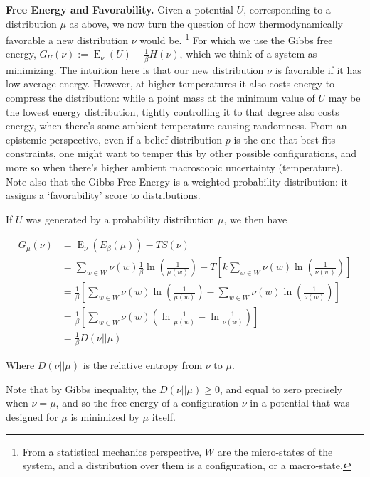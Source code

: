 \documentclass{article}
\theoremstyle{plain}
\theoremstyle{definition}
\theoremstyle{remark}
\DeclareMathOperator{\E}{\mathrm{E}} %
\numberwithin{equation}{section}
\begin{document}
	\textbf{Free Energy and Favorability.} Given a potential $U$, corresponding to a distribution $\mu$ as above, we now turn the question of how thermodynamically favorable a new distribution $\nu$ would be.%
		\footnote{From a statistical mechanics perspective, $W$ are the micro-states of the system, and a distribution over them is a configuration, or a macro-state.}
	For which we use the Gibbs free energy, $G_U(\nu) := {\E}_\nu( U ) - \frac{1}{\beta} H(\nu)$, which we think of a system as minimizing. The intuition here is that our new distribution $\nu$ is favorable if it has low average energy. However, at higher temperatures it also costs energy to compress the distribution: while a point mass at the minimum value of $U$ may be the lowest energy distribution, tightly controlling it to that degree also costs energy, when there's some ambient temperature causing randomness. From an epistemic perspective, even if a belief distribution $p$  is the one that best fits constraints, one might want to temper this by other possible configurations, and more so when there's higher ambient macroscopic uncertainty (temperature). Note also that the Gibbs Free Energy is a weighted probability distribution: it assigns a `favorability' score to distributions.
	
	If $U$ was generated by a probability distribution $\mu$, we then have
	
	\begin{align*}
		G_\mu(\nu) &= {\E}_\nu( E_\beta(\mu) )  - T S(\nu) \\
		&= \sum_{w \in W}\nu(w) \frac{1}{\beta} \ln \left(\frac{1}{\mu(w)}\right) - T \left[k \sum_{w \in W} \nu(w) \ln \left(\frac{1}{\nu(w)}\right)\right]\\
		&=  \frac{1}{\beta}\left[\sum_{w \in W}\nu(w) \ln \left(\frac{1}{\mu(w)}\right) - \sum_{w \in W} \nu(w) \ln \left(\frac{1}{\nu(w)}\right)\right]\\
		&=  \frac{1}{\beta}\left[\sum_{w \in W}\nu(w) \left(\ln \frac{1}{\mu(w)} - \ln \frac{1}{\nu(w)}\right)\right]\\
		&= \frac{1}{\beta} D \left(\nu || \mu \right)
	\end{align*}

	Where $D(\nu || \mu)$ is the relative entropy from $\nu$ to $\mu$. 
	
	Note that by Gibbs inequality, the $D(\nu || \mu) \geq 0$, and equal to zero precisely when $\nu = \mu$, and so the free energy of a configuration $\nu$ in a potential that was designed for $\mu$ is minimized by $\mu$ itself.	
\end{document}
